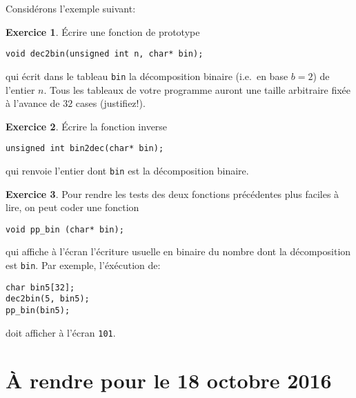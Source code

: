 \documentclass[french,a4paper]{article}
\theoremstyle{definition}
\newtheorem{exercise}{Exercice}
\theoremstyle{remark}
\newcommand{\shell}[1]{\lstinline[style=sh]|#1|}
\newcommand{\inlinec}[1]{\lstinline[style=C]°#1°}
\begin{document}
Considérons l'exemple suivant: 

\begin{exercise}
  \'Ecrire une fonction de prototype
  \begin{lstlisting}
void dec2bin(unsigned int n, char* bin);
  \end{lstlisting}
  qui écrit dans le tableau \inlinec{bin} la décomposition binaire
  (i.e.\ en base $b=2$) de l'entier $n$. Tous les tableaux de votre
  programme auront une taille arbitraire fixée à l'avance de $32$
  cases (justifiez!).
\end{exercise}

\begin{exercise}
  \'Ecrire la fonction inverse
  \begin{lstlisting}
unsigned int bin2dec(char* bin);
  \end{lstlisting}
  qui renvoie l'entier dont \inlinec{bin} est la décomposition
  binaire.
\end{exercise}

\begin{exercise}
  Pour rendre les tests des deux fonctions précédentes plus faciles à
  lire, on peut coder une fonction
  \begin{lstlisting}
void pp_bin (char* bin);
  \end{lstlisting}
  qui affiche à l'écran l'écriture usuelle en binaire du nombre dont
  la décomposition est \inlinec{bin}. Par exemple, l'éxécution
  de:
  \begin{lstlisting}
char bin5[32];
dec2bin(5, bin5);
pp_bin(bin5);
  \end{lstlisting}
  doit afficher à l'écran \shell{101}.
\end{exercise}


\section{\`A rendre pour le 18 octobre 2016}
\label{sec:homeworks}
\end{document}
